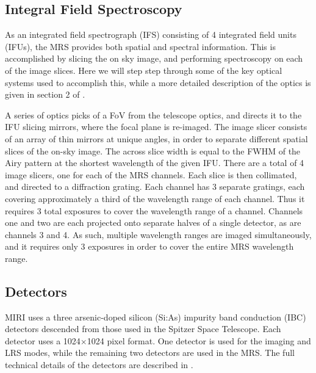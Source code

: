 \subsection{Integral Field Spectroscopy}
As an integrated field spectrograph (IFS) consisting of 4 integrated field units (IFUs), the MRS provides both spatial and spectral information.
This is accomplished by slicing the on sky image, and performing spectroscopy on each of the image slices. 
Here we will step step through some of the key optical systems used to accomplish this, while a more detailed description of the optics is given in section 2 of \parencite{MIRI6}.

A series of optics picks of a FoV from the telescope optics, and directs it to the IFU slicing mirrors, where the focal plane is re-imaged. 
The image slicer consists of an array of thin mirrors at unique angles, in order to separate different spatial slices of the on-sky image.
The across slice width is equal to the FWHM of the Airy pattern at the shortest wavelength of the given IFU.
There are a total of 4 image slicers, one for each of the MRS channels.
Each slice is then collimated, and directed to a diffraction grating. Each channel has 3 separate gratings, each covering approximately a third of the wavelength range of each channel. 
Thus it requires 3 total exposures to cover the wavelength range of a channel.
Channels one and two are each projected onto separate halves of a single detector, as are channels 3 and 4.
As such, multiple wavelength ranges are imaged simultaneously, and it requires only 3 exposures in order to cover the entire MRS wavelength range. 
\subsection{Detectors}
MIRI uses a three arsenic-doped silicon (Si:As) impurity band conduction (IBC) detectors descended from those used in the Spitzer Space Telescope.
Each detector uses a 1024$\times$1024 pixel format.
One detector is used for the imaging and LRS modes, while the remaining two detectors are used in the MRS.
The full technical details of the detectors are described in \parencite{MIRI7}.

